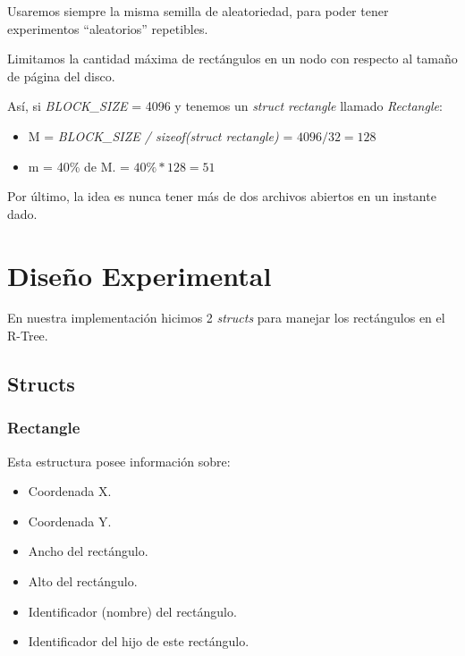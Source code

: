 \documentclass[letterpaper,10pt]{article}
\begin{document}
	Usaremos siempre la misma semilla de aleatoriedad, para poder tener experimentos ``aleatorios'' repetibles.

	Limitamos la cantidad máxima de rectángulos en un nodo con respecto al tamaño de página del disco.

	Así, si \textit{BLOCK\_SIZE} = 4096 y tenemos un \textit{struct rectangle} llamado \textit{Rectangle}:

	\begin{itemize}
		\item M = \textit{BLOCK\_SIZE / sizeof(struct rectangle)} = $ 4096 / 32 = 128 $
		\item m = 40\% de M. = $ 40\% * 128 = 51 $
	\end{itemize}

	Por último, la idea es nunca tener más de dos archivos abiertos en un instante dado.

	\newpage

	\section{Diseño Experimental}

	En nuestra implementación hicimos 2 \textit{structs} para manejar los rectángulos en el R-Tree.

	\subsection{Structs}

	\subsubsection{Rectangle}

	Esta estructura posee información sobre:
	\begin{itemize}
		\item Coordenada X.
		\item Coordenada Y.
		\item Ancho del rectángulo.
		\item Alto del rectángulo.
		\item Identificador (nombre) del rectángulo.
		\item Identificador del hijo de este rectángulo.
	\end{itemize}
\end{document}
